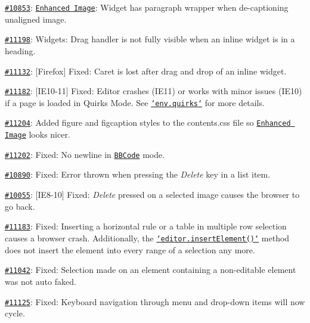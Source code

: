 \begin{DoxyItemize}
\item \href{http://dev.ckeditor.com/ticket/10853}{\tt \#10853}\-: \href{http://ckeditor.com/addon/image2}{\tt Enhanced Image}\-: Widget has paragraph wrapper when de-\/captioning unaligned image.
\item \href{http://dev.ckeditor.com/ticket/11198}{\tt \#11198}\-: Widgets\-: Drag handler is not fully visible when an inline widget is in a heading.
\item \href{http://dev.ckeditor.com/ticket/11132}{\tt \#11132}\-: \mbox{[}Firefox\mbox{]} Fixed\-: Caret is lost after drag and drop of an inline widget.
\item \href{http://dev.ckeditor.com/ticket/11182}{\tt \#11182}\-: \mbox{[}I\-E10-\/11\mbox{]} Fixed\-: Editor crashes (I\-E11) or works with minor issues (I\-E10) if a page is loaded in Quirks Mode. See \href{http://docs.ckeditor.com/#!/api/CKEDITOR.env-property-quirks}{\tt `env.quirks`} for more details.
\item \href{http://dev.ckeditor.com/ticket/11204}{\tt \#11204}\-: Added {\ttfamily figure} and {\ttfamily figcaption} styles to the {\ttfamily contents.\-css} file so \href{http://ckeditor.com/addon/image2}{\tt Enhanced Image} looks nicer.
\item \href{http://dev.ckeditor.com/ticket/11202}{\tt \#11202}\-: Fixed\-: No newline in \href{http://ckeditor.com/addon/bbcode}{\tt B\-B\-Code} mode.
\item \href{http://dev.ckeditor.com/ticket/10890}{\tt \#10890}\-: Fixed\-: Error thrown when pressing the {\itshape Delete} key in a list item.
\item \href{http://dev.ckeditor.com/ticket/10055}{\tt \#10055}\-: \mbox{[}I\-E8-\/10\mbox{]} Fixed\-: {\itshape Delete} pressed on a selected image causes the browser to go back.
\item \href{http://dev.ckeditor.com/ticket/11183}{\tt \#11183}\-: Fixed\-: Inserting a horizontal rule or a table in multiple row selection causes a browser crash. Additionally, the \href{http://docs.ckeditor.com/#!/api/CKEDITOR.editor-method-insertElement}{\tt `editor.insert\-Element()`} method does not insert the element into every range of a selection any more.
\item \href{http://dev.ckeditor.com/ticket/11042}{\tt \#11042}\-: Fixed\-: Selection made on an element containing a non-\/editable element was not auto faked.
\item \href{http://dev.ckeditor.com/ticket/11125}{\tt \#11125}\-: Fixed\-: Keyboard navigation through menu and drop-\/down items will now cycle.

\end{DoxyItemize}
